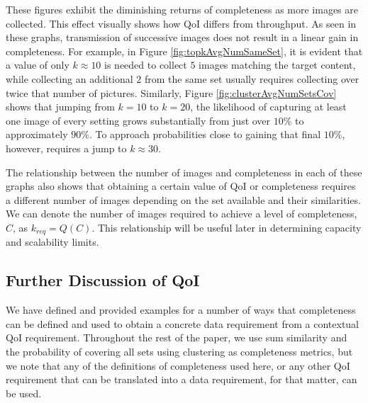 These figures exhibit the diminishing returns of completeness as more images are collected.  This effect visually shows how QoI differs from throughput.  As seen in these graphs, transmission of successive images does not result in a linear gain in completeness.  For example, in Figure \ref{fig:topkAvgNumSameSet}, it is evident that a value of only $k \approx 10$ is needed to collect $5$ images matching the target content, while collecting an additional $2$ from the same set usually requires collecting over twice that number of pictures.  
Similarly, Figure \ref{fig:clusterAvgNumSetsCov} shows that jumping from $k=10$ to $k=20$, the likelihood of capturing at least one image of every setting grows substantially from just over $10\%$ to approximately $90\%$.  To approach probabilities close to gaining that final $10\%$, however, requires a jump to $k\approx30$.  

The relationship between the number of images and completeness in each of these graphs also shows that obtaining a certain value of QoI or completeness requires a different number of images depending on the set available and their similarities.  We can denote the number of images required to achieve a level of completeness, $C$, as $k_{req} = Q(C)$.  This relationship will be useful later in determining capacity and scalability limits.

\subsection{Further Discussion of QoI}
We have defined and provided examples for a number of ways that completeness can be defined and used to obtain a concrete data requirement from a contextual QoI requirement.  Throughout the rest of the paper, we use sum similarity and the probability of covering all sets using clustering as completeness metrics, but we note that any of the definitions of completeness used here, or any other QoI requirement that can be translated into a data requirement, for that matter, can be used. %

